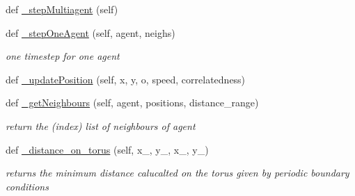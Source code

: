 \begin{DoxyCompactItemize}
\item 
def \hyperlink{class_mu_mo_t_1_1_mu_mo_tmultiagent_view_a80b7d1f8c2f44ea9f4154b79f0baacfb}{\+\_\+step\+Multiagent} (self)
\item 
def \hyperlink{class_mu_mo_t_1_1_mu_mo_tmultiagent_view_a87f5913cd055f8e4eaa70b058ad7d77b}{\+\_\+step\+One\+Agent} (self, agent, neighs)
\begin{DoxyCompactList}\small\item\em one timestep for one agent \end{DoxyCompactList}\item 
def \hyperlink{class_mu_mo_t_1_1_mu_mo_tmultiagent_view_aba4da96cc2e7682af895cda4b1310790}{\+\_\+update\+Position} (self, x, y, o, speed, correlatedness)
\item 
def \hyperlink{class_mu_mo_t_1_1_mu_mo_tmultiagent_view_ad3df4b96d9dec10c8b806eb6697c6028}{\+\_\+get\+Neighbours} (self, agent, positions, distance\+\_\+range)
\begin{DoxyCompactList}\small\item\em return the (index) list of neighbours of \textquotesingle{}agent\textquotesingle{} \end{DoxyCompactList}\item 
def \hyperlink{class_mu_mo_t_1_1_mu_mo_tmultiagent_view_aa88fd0656cfcc7c9671c2bcc61d7726e}{\+\_\+distance\+\_\+on\+\_\+torus} (self, x\+\_, y\+\_, x\+\_, y\+\_)
\begin{DoxyCompactList}\small\item\em returns the minimum distance calucalted on the torus given by periodic boundary conditions \end{DoxyCompactList}\end{DoxyCompactItemize}
